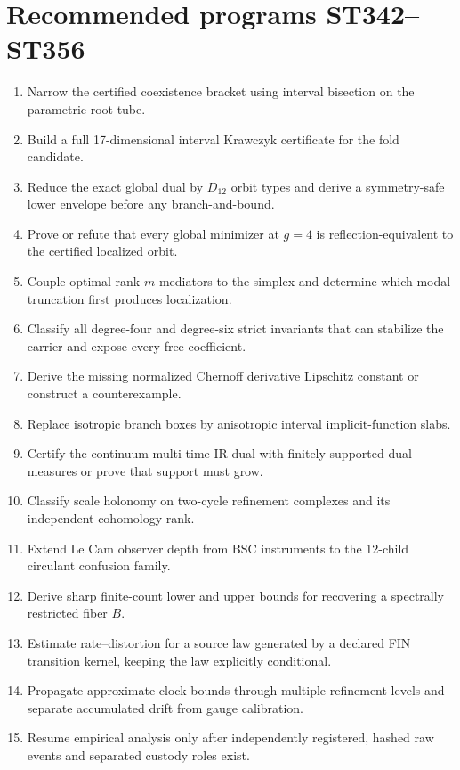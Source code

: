 \documentclass[11pt,a4paper]{article}
\begin{document}
\section{Recommended programs ST342--ST356}
\begin{enumerate}
\item[\textbf{ST342}.] Narrow the certified coexistence bracket using interval bisection on the parametric root tube.
\item[\textbf{ST343}.] Build a full 17-dimensional interval Krawczyk certificate for the fold candidate.
\item[\textbf{ST344}.] Reduce the exact global dual by $D_{12}$ orbit types and derive a symmetry-safe lower envelope before any branch-and-bound.
\item[\textbf{ST345}.] Prove or refute that every global minimizer at $g=4$ is reflection-equivalent to the certified localized orbit.
\item[\textbf{ST346}.] Couple optimal rank-$m$ mediators to the simplex and determine which modal truncation first produces localization.
\item[\textbf{ST347}.] Classify all degree-four and degree-six strict invariants that can stabilize the carrier and expose every free coefficient.
\item[\textbf{ST348}.] Derive the missing normalized Chernoff derivative Lipschitz constant or construct a counterexample.
\item[\textbf{ST349}.] Replace isotropic branch boxes by anisotropic interval implicit-function slabs.
\item[\textbf{ST350}.] Certify the continuum multi-time IR dual with finitely supported dual measures or prove that support must grow.
\item[\textbf{ST351}.] Classify scale holonomy on two-cycle refinement complexes and its independent cohomology rank.
\item[\textbf{ST352}.] Extend Le Cam observer depth from BSC instruments to the 12-child circulant confusion family.
\item[\textbf{ST353}.] Derive sharp finite-count lower and upper bounds for recovering a spectrally restricted fiber $B$.
\item[\textbf{ST354}.] Estimate rate--distortion for a source law generated by a declared FIN transition kernel, keeping the law explicitly conditional.
\item[\textbf{ST355}.] Propagate approximate-clock bounds through multiple refinement levels and separate accumulated drift from gauge calibration.
\item[\textbf{ST356}.] Resume empirical analysis only after independently registered, hashed raw events and separated custody roles exist.
\end{enumerate}
\end{document}
